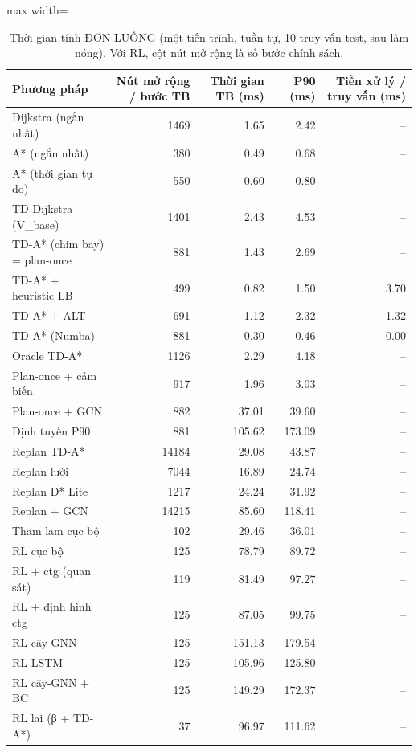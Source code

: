 \begin{table}[!htbp]
\centering
\small
\caption{Thời gian tính ĐƠN LUỒNG (một tiến trình, tuần tự, 10 truy vấn test, sau làm nóng). Với RL, cột nút mở rộng là số bước chính sách.}
\label{tab:tab_runtime_single}
\begin{adjustbox}{max width=\linewidth}
\begin{tabular}{lrrrr}
\toprule
Phương pháp & Nút mở rộng / bước TB & Thời gian TB (ms) & P90 (ms) & Tiền xử lý / truy vấn (ms) \\
\midrule
Dijkstra (ngắn nhất) & 1469 & 1.65 & 2.42 & -- \\
A* (ngắn nhất) & 380 & 0.49 & 0.68 & -- \\
A* (thời gian tự do) & 550 & 0.60 & 0.80 & -- \\
TD-Dijkstra (V\_base) & 1401 & 2.43 & 4.53 & -- \\
TD-A* (chim bay) = plan-once & 881 & 1.43 & 2.69 & -- \\
TD-A* + heuristic LB & 499 & 0.82 & 1.50 & 3.70 \\
TD-A* + ALT & 691 & 1.12 & 2.32 & 1.32 \\
TD-A* (Numba) & 881 & 0.30 & 0.46 & 0.00 \\
Oracle TD-A* & 1126 & 2.29 & 4.18 & -- \\
Plan-once + cảm biến & 917 & 1.96 & 3.03 & -- \\
Plan-once + GCN & 882 & 37.01 & 39.60 & -- \\
Định tuyến P90 & 881 & 105.62 & 173.09 & -- \\
Replan TD-A* & 14184 & 29.08 & 43.87 & -- \\
Replan lười & 7044 & 16.89 & 24.74 & -- \\
Replan D* Lite & 1217 & 24.24 & 31.92 & -- \\
Replan + GCN & 14215 & 85.60 & 118.41 & -- \\
Tham lam cục bộ & 102 & 29.46 & 36.01 & -- \\
RL cục bộ & 125 & 78.79 & 89.72 & -- \\
RL + ctg (quan sát) & 119 & 81.49 & 97.27 & -- \\
RL + định hình ctg & 125 & 87.05 & 99.75 & -- \\
RL cây-GNN & 125 & 151.13 & 179.54 & -- \\
RL LSTM & 125 & 105.96 & 125.80 & -- \\
RL cây-GNN + BC & 125 & 149.29 & 172.37 & -- \\
RL lai (β + TD-A*) & 37 & 96.97 & 111.62 & -- \\
\bottomrule
\end{tabular}
\end{adjustbox}
\end{table}
